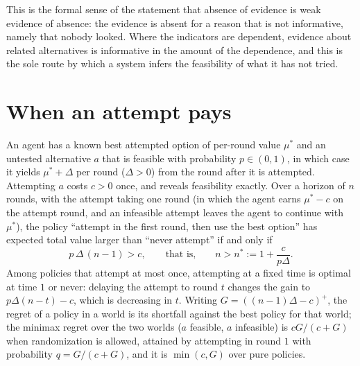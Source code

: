 This is the formal sense of the statement that absence of evidence is weak evidence of absence: the evidence is absent for a reason that is not informative, namely that nobody looked. Where the indicators are dependent, evidence about related alternatives is informative in the amount of the dependence, and this is the sole route by which a system infers the feasibility of what it has not tried.

\section{When an attempt pays}

\begin{newresult}\label{thm:threshold}
An agent has a known best attempted option of per-round value $\mu^*$ and an untested alternative $a$ that is feasible with probability $p\in(0,1)$, in which case it yields $\mu^*+\Delta$ per round ($\Delta>0$) from the round after it is attempted. Attempting $a$ costs $c>0$ once, and reveals feasibility exactly. Over a horizon of $n$ rounds, with the attempt taking one round (in which the agent earns $\mu^*-c$ on the attempt round, and an infeasible attempt leaves the agent to continue with $\mu^*$), the policy ``attempt in the first round, then use the best option'' has expected total value larger than ``never attempt'' if and only if
\[
p\,\Delta\,(n-1)>c,\qquad\text{that is,}\qquad n>n^*:=1+\frac{c}{p\Delta}.
\]
Among policies that attempt at most once, attempting at a fixed time is optimal at time $1$ or never: delaying the attempt to round $t$ changes the gain to $p\Delta(n-t)-c$, which is decreasing in $t$. Writing $G=((n-1)\Delta-c)^+$, the regret of a policy in a world is its shortfall against the best policy for that world; the minimax regret over the two worlds ($a$ feasible, $a$ infeasible) is $cG/(c+G)$ when randomization is allowed, attained by attempting in round $1$ with probability $q=G/(c+G)$, and it is $\min(c,G)$ over pure policies.
\end{newresult}
